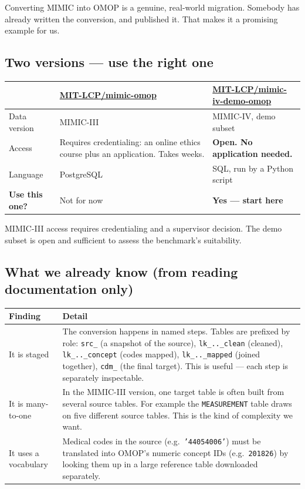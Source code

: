 \documentclass[11pt,a4paper]{article}
\newcommand{\code}[1]{\texttt{\small #1}}
\begin{document}
Converting MIMIC into OMOP is a genuine, real-world migration. Somebody has already written
the conversion, and published it. That makes it a promising example for us.

\subsection{Two versions --- use the right one}

\begin{center}
\begin{tabular}{@{}L{3.6cm}L{5.4cm}L{5.4cm}@{}}
\toprule
& \textbf{\href{https://github.com/MIT-LCP/mimic-omop}{MIT-LCP/mimic-omop}} & \textbf{\href{https://github.com/MIT-LCP/mimic-iv-demo-omop}{MIT-LCP/mimic-iv-demo-omop}} \\
\midrule
Data version & MIMIC-III & MIMIC-IV, demo subset \\
Access & Requires credentialing: an online ethics course plus an application. Takes weeks. & \textbf{Open. No application needed.} \\
Language & PostgreSQL & SQL, run by a Python script \\
\midrule
\textbf{Use this one?} & Not for now & \textbf{Yes --- start here} \\
\bottomrule
\end{tabular}
\end{center}

\begin{warnbox}
MIMIC-III access requires credentialing and a supervisor decision. The demo subset is
open and sufficient to assess the benchmark's suitability.
\end{warnbox}

\subsection{What we already know (from reading documentation only)}

\begin{center}
\begin{tabular}{@{}L{4.0cm}L{11.5cm}@{}}
\toprule
\textbf{Finding} & \textbf{Detail} \\
\midrule
It is staged & The conversion happens in named steps. Tables are prefixed by role:
\code{src\_} (a snapshot of the source), \code{lk\_..\_clean} (cleaned), \code{lk\_..\_concept}
(codes mapped), \code{lk\_..\_mapped} (joined together), \code{cdm\_} (the final target).
This is useful --- each step is separately inspectable. \\
\addlinespace[2pt]
It is many-to-one & In the MIMIC-III version, one target table is often built from several
source tables. For example the \code{MEASUREMENT} table draws on five different source
tables. This is the kind of complexity we want. \\
\addlinespace[2pt]
It uses a vocabulary & Medical codes in the source (e.g.\ \code{'44054006'}) must be
translated into OMOP's numeric concept IDs (e.g.\ \code{201826}) by looking them up in a
large reference table downloaded separately. \\
\bottomrule
\end{tabular}
\end{center}
\end{document}
